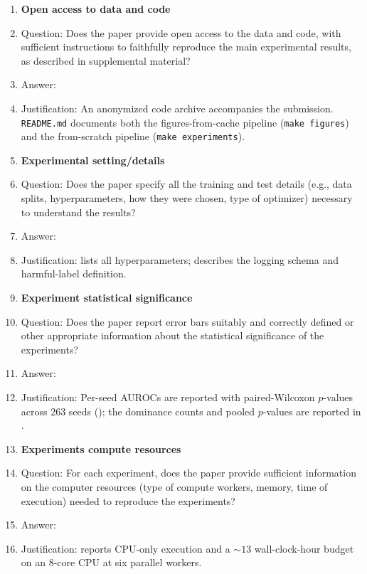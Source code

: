 \begin{enumerate}
\item {\bf Open access to data and code}
    \item[] Question: Does the paper provide open access to the data and code, with sufficient instructions to faithfully reproduce the main experimental results, as described in supplemental material?
    \item[] Answer: \answerYes{}
    \item[] Justification: An anonymized code archive accompanies the submission. \texttt{README.md} documents both the figures-from-cache pipeline (\texttt{make figures}) and the from-scratch pipeline (\texttt{make experiments}).

\item {\bf Experimental setting/details}
    \item[] Question: Does the paper specify all the training and test details (e.g., data splits, hyperparameters, how they were chosen, type of optimizer) necessary to understand the results?
    \item[] Answer: \answerYes{}
    \item[] Justification:  lists all hyperparameters;  describes the logging schema and harmful-label definition.

\item {\bf Experiment statistical significance}
    \item[] Question: Does the paper report error bars suitably and correctly defined or other appropriate information about the statistical significance of the experiments?
    \item[] Answer: \answerYes{}
    \item[] Justification: Per-seed AUROCs are reported with paired-Wilcoxon $p$-values across $263$ seeds (); the dominance counts and pooled $p$-values are reported in .

\item {\bf Experiments compute resources}
    \item[] Question: For each experiment, does the paper provide sufficient information on the computer resources (type of compute workers, memory, time of execution) needed to reproduce the experiments?
    \item[] Answer: \answerYes{}
    \item[] Justification:  reports CPU-only execution and a $\sim 13$ wall-clock-hour budget on an 8-core CPU at six parallel workers.


\end{enumerate}
